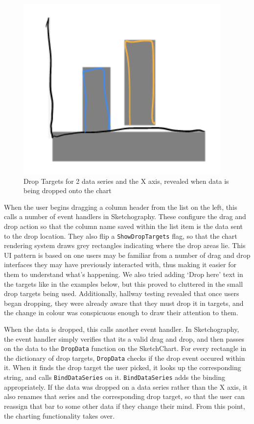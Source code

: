 	\begin{figure}[h]
	\centering
	\includegraphics[scale=1]{droptargets}
	\caption{Drop Targets for 2 data series and the X axis, revealed when data is being dropped onto the chart}
	\end{figure}
	
	When the user begins dragging a column header from the list on the left, this calls a number of event handlers in Sketchography. These configure the drag and drop action so that the column name saved within the list item is the data sent to the drop location. They also flip a \texttt{ShowDropTargets} flag, so that the chart rendering system draws grey rectangles indicating where the drop areas lie. This UI pattern is based on one users may be familiar from a number of drag and drop interfaces they may have previously interacted with, thus making it easier for them to understand what's happening. We also tried adding `Drop here' text in the targets like in the examples below, but this proved to cluttered in the small drop targets being used. Additionally, hallway testing revealed that once users began dropping, they were already aware that they must drop it in targets, and the change in colour was conspicuous enough to draw their attention to them.
	
	When the data is dropped, this calls another event handler. In Sketchography, the event handler simply verifies that its a valid drag and drop, and then passes on the data to the \texttt{DropData} function on the SketchChart. For every rectangle in the dictionary of drop targets, \texttt{DropData} checks if the drop event occured within it. When it finds the drop target the user picked, it looks up the corresponding string, and calls \texttt{BindDataSeries} on it. \texttt{BindDataSeries} adds the binding appropriately. If the data was dropped on a data series rather than the X axis, it also renames that series and the corresponding drop target, so that the user can reassign that bar to some other data if they change their mind. From this point, the charting functionality takes over.
	
